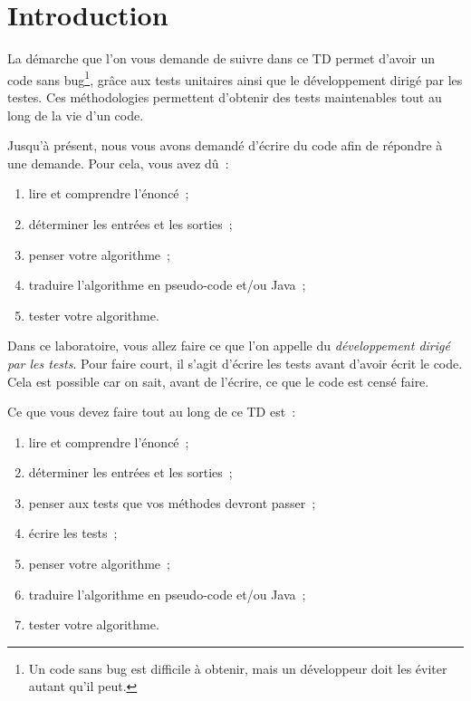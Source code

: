 \documentclass[a4paper,11pt]{style-esi/td}
\begin{document}

\section{Introduction}

	La démarche que l'on vous demande de suivre dans ce TD permet d'avoir un code sans bug\footnote{Un code sans bug est difficile à obtenir, mais un développeur doit les éviter autant qu'il peut.}, grâce aux tests unitaires ainsi que le développement dirigé par les testes. Ces méthodologies permettent d'obtenir des tests maintenables tout au long de la vie d'un code.

	Jusqu'à présent, nous vous avons demandé d'écrire du code afin de répondre à une demande. Pour cela, vous avez dû~:
	\begin{enumerate}
		\item lire et comprendre l'énoncé~;
		\item déterminer les entrées et les sorties~;
		\item penser votre algorithme~;
		\item traduire l'algorithme en pseudo-code et/ou Java~;
		\item tester votre algorithme.
	\end{enumerate}

	Dans ce laboratoire, vous allez faire ce que l'on appelle du \emph{développement dirigé par les tests}. Pour faire court, il s'agit d'écrire les tests avant d'avoir écrit le code. Cela est possible car on sait, avant de l'écrire, ce que le code est censé faire.

	Ce que vous devez faire tout au long de ce TD est~:
	\begin{enumerate}
		\item lire et comprendre l'énoncé~;
		\item déterminer les entrées et les sorties~;
		\item penser aux tests que vos méthodes devront passer~;
		\item écrire les tests~;
		\item penser votre algorithme~;
		\item traduire l'algorithme en pseudo-code et/ou Java~;
		\item tester votre algorithme.
	\end{enumerate}
\end{document}
